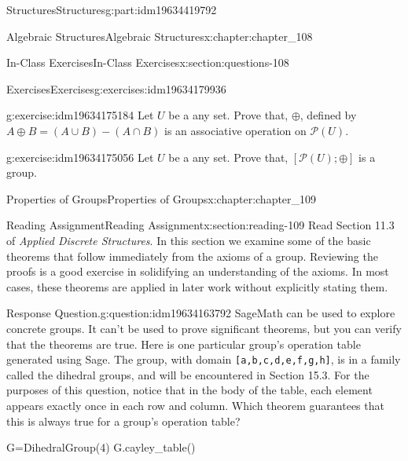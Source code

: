 \documentclass[oneside,10pt,]{book}
\newcommand{\mono}[1]{\texttt{#1}}
\numberwithin{equation}{section}
\begin{document}
\begin{partptx}{Structures}{}{Structures}{}{}{g:part:idm19634419792}
\begin{chapterptx}{Algebraic Structures}{}{Algebraic Structures}{}{}{x:chapter:chapter_108}
\begin{sectionptx}{In-Class Exercises}{}{In-Class Exercises}{}{}{x:section:questions-108}
\begin{exercises-subsection-numberless}{Exercises}{}{Exercises}{}{}{g:exercises:idm19634179936}
\begin{exercisegroup}
\begin{divisionexerciseeg}{3}{}{}{g:exercise:idm19634175184}
Let \(U\) be a any set.  Prove that, \(\oplus\), defined by \(A \oplus  B = (A \cup  B) - (A \cap  B)\) is an associative operation on \(\mathcal{P}(U)\).%
\end{divisionexerciseeg}%
\begin{divisionexerciseeg}{4}{}{}{g:exercise:idm19634175056}%
Let \(U\) be a any set.  Prove that,   \([\mathcal{P}(U); \oplus]\) is a group.%
\end{divisionexerciseeg}%
\end{exercisegroup}
\par\medskip\noindent
\end{exercises-subsection-numberless}
\end{sectionptx}
\end{chapterptx}
%
\typeout{************************************************}
\typeout{************************************************}
%
\begin{chapterptx}{Properties of Groups}{}{Properties of Groups}{}{}{x:chapter:chapter_109}
%
%
%
\typeout{************************************************}
\typeout{************************************************}
%
\begin{sectionptx}{Reading Assignment}{}{Reading Assignment}{}{}{x:section:reading-109}
Read Section 11.3 of \emph{Applied Discrete Structures}.  In this section we examine some of the basic theorems that follow immediately from the axioms of a group. Reviewing the proofs is a good exercise in solidifying an understanding of the axioms. In most cases, these theorems are applied in later work without explicitly stating them.%
\begin{question}{Response Question.}{g:question:idm19634163792}%
SageMath can be used to explore concrete groups.  It can't be used to prove significant theorems, but you can verify that the theorems are true.  Here is one particular group's operation table generated using Sage. The group, with domain \mono{[a,b,c,d,e,f,g,h]}, is in a family called the dihedral groups, and will be encountered in Section 15.3. For the purposes of this question, notice that in the body of the table, each element appears exactly once in each row and column.  Which theorem guarantees that this is always true for a group's operation table?%
\begin{sageinput}
G=DihedralGroup(4)
G.cayley_table()
\end{sageinput}
\begin{sageoutput}

\end{sageoutput}
\end{question}
\end{sectionptx}
\end{chapterptx}
\end{partptx}
\end{document}
